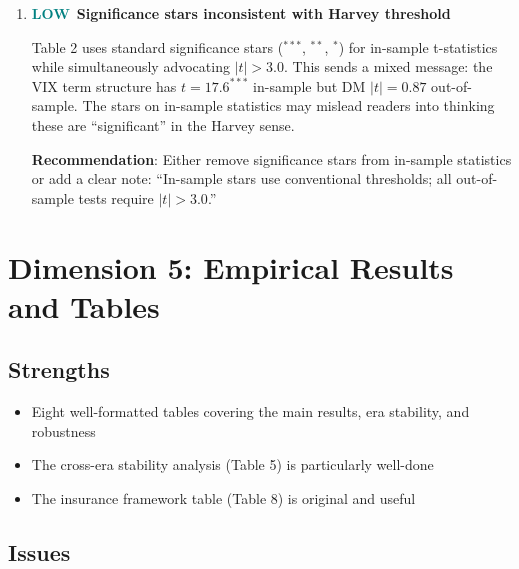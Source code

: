 \documentclass[12pt,a4paper]{article}
\newcommand{\LOW}{\textcolor{teal}{\textbf{LOW}}}
\begin{document}
\begin{enumerate}[label=D4.\arabic*]
\item \LOW\ \textbf{Significance stars inconsistent with Harvey threshold}

Table 2 uses standard significance stars ($^{***}$, $^{**}$, $^{*}$) for in-sample t-statistics while simultaneously advocating $|t|>3.0$. This sends a mixed message: the VIX term structure has $t=17.6^{***}$ in-sample but DM $|t|=0.87$ out-of-sample. The stars on in-sample statistics may mislead readers into thinking these are ``significant'' in the Harvey sense.

\textbf{Recommendation}: Either remove significance stars from in-sample statistics or add a clear note: ``In-sample stars use conventional thresholds; all out-of-sample tests require $|t|>3.0$.''

\end{enumerate}


\section{Dimension 5: Empirical Results and Tables}
\label{sec:d5}

\subsection*{Strengths}
\begin{itemize}
    \item Eight well-formatted tables covering the main results, era stability, and robustness
    \item The cross-era stability analysis (Table 5) is particularly well-done
    \item The insurance framework table (Table 8) is original and useful
\end{itemize}

\subsection*{Issues}
\end{document}
